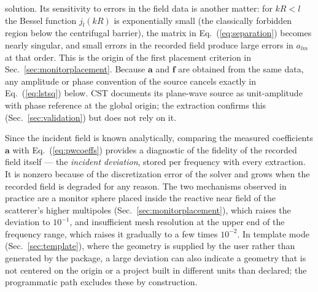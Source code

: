 \documentclass[11pt]{article}
\begin{document}
solution.  Its sensitivity to errors in the field data is another
matter: for $kR < l$ the Bessel function $j_l(kR)$ is exponentially
small (the classically forbidden region below the centrifugal barrier),
the matrix in Eq.~(\ref{eq:separation}) becomes nearly singular, and
small errors in the recorded field produce large errors in $a_{lm}$ at
that order.  This is the origin of the first placement criterion in
Sec.~\ref{sec:monitorplacement}.  Because $\mathbf{a}$ and $\mathbf{f}$
are obtained from the same data, any amplitude or phase convention of
the source cancels exactly in Eq.~(\ref{eq:lstsq}) below.  CST documents
its plane-wave source as unit-amplitude with phase reference at the
global origin; the extraction confirms this
(Sec.~\ref{sec:validation}) but does not rely on it.

Since the incident field is known analytically, comparing the measured
coefficients $\mathbf{a}$ with Eq.~(\ref{eq:pwcoeffs}) provides a
diagnostic of the fidelity of the recorded field itself --- the
\emph{incident deviation}, stored per frequency with every extraction.
It is nonzero because of the discretization error of the solver and
grows when the recorded field is degraded for any reason.  The two
mechanisms observed in practice are a monitor sphere placed inside the
reactive near field of the scatterer's higher multipoles
(Sec.~\ref{sec:monitorplacement}), which raises the deviation to
$10^{-1}$, and insufficient mesh resolution at the upper end of the
frequency range,
which raises it gradually to a few times $10^{-2}$.  In template mode
(Sec.~\ref{sec:template}), where the geometry is supplied by the user
rather than generated by the package, a large deviation can also
indicate a geometry that is not centered on the origin or a project
built in different units than declared; the programmatic path excludes
these by construction.
\end{document}
